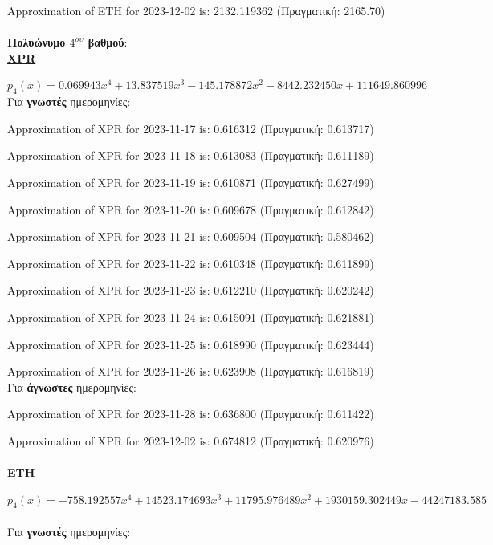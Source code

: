 \documentclass[a4paper, 14pt]{article}   %
\begin{document}
Approximation of ETH for 2023-12-02 is: 2132.119362 \small{(Πραγματική: 2165.70)}\\\\
\textbf{Πολυώνυμο $4^{ου}$ βαθμού}:\\

\textbf{\underline{XPR}}

$p_4(x) = 0.069943x^4 + 13.837519x^3 - 145.178872x^2 - 8442.232450x + 111649.860996$\\

Για \textbf{γνωστές} ημερομηνίες:

Approximation of XPR for 2023-11-17 is: 0.616312 \small{(Πραγματική: 0.613717)}

Approximation of XPR for 2023-11-18 is: 0.613083 \small{(Πραγματική: 0.611189)}

Approximation of XPR for 2023-11-19 is: 0.610871 \small{(Πραγματική: 0.627499)}

Approximation of XPR for 2023-11-20 is: 0.609678 \small{(Πραγματική: 0.612842)}

Approximation of XPR for 2023-11-21 is: 0.609504 \small{(Πραγματική: 0.580462)}

Approximation of XPR for 2023-11-22 is: 0.610348 \small{(Πραγματική: 0.611899)}

Approximation of XPR for 2023-11-23 is: 0.612210 \small{(Πραγματική: 0.620242)}

Approximation of XPR for 2023-11-24 is: 0.615091 \small{(Πραγματική: 0.621881)}

Approximation of XPR for 2023-11-25 is: 0.618990 \small{(Πραγματική: 0.623444)}

Approximation of XPR for 2023-11-26 is: 0.623908 \small{(Πραγματική: 0.616819)}\\

Για \textbf{άγνωστες} ημερομηνίες:

Approximation of XPR for 2023-11-28 is: 0.636800 \small{(Πραγματική: 0.611422)}

Approximation of XPR for 2023-12-02 is: 0.674812 \small{(Πραγματική: 0.620976)}\\\\

\textbf{\underline{ETH}}

$p_4(x) = -758.192557x^4 + 14523.174693x^3 + 11795.976489x^2 + 1930159.302449x - 44247183.585$\\\\

Για \textbf{γνωστές} ημερομηνίες:
\end{document}
